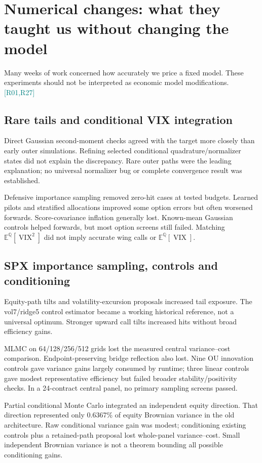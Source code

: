 \documentclass[11pt,a4paper]{article}
\newcommand{\E}{\mathbb E^{\mathbb Q}}
\newcommand{\VIX}{\operatorname{VIX}}
\newcommand{\src}[1]{\textcolor{teal}{\small[#1]}}
\begin{document}
\section{Numerical changes: what they taught us without changing the model}\label{sec:numerics}
Many weeks of work concerned how accurately we price a fixed model. These experiments should not be interpreted as economic model modifications. \src{R01,R27}

\subsection{Rare tails and conditional VIX integration}
Direct Gaussian second-moment checks agreed with the target more closely than early outer simulations. Refining selected conditional quadrature/normalizer states did not explain the discrepancy. Rare outer paths were the leading explanation; no universal normalizer bug or complete convergence result was established.

Defensive importance sampling removed zero-hit cases at tested budgets. Learned pilots and stratified allocations improved some option errors but often worsened forwards. Score-covariance inflation generally lost. Known-mean Gaussian controls helped forwards, but most option screens still failed. Matching $\E[\VIX^2]$ did not imply accurate wing calls or $\E[\VIX]$.

\subsection{SPX importance sampling, controls and conditioning}
Equity-path tilts and volatility-excursion proposals increased tail exposure. The vol7/ridge5 control estimator became a working historical reference, not a universal optimum. Stronger upward call tilts increased hits without broad efficiency gains.

MLMC on 64/128/256/512 grids lost the measured central variance--cost comparison. Endpoint-preserving bridge reflection also lost. Nine OU innovation controls gave variance gains largely consumed by runtime; three linear controls gave modest representative efficiency but failed broader stability/positivity checks. In a 24-contract central panel, no primary sampling screens passed.

Partial conditional Monte Carlo integrated an independent equity direction. That direction represented only 0.6367\% of equity Brownian variance in the old architecture. Raw conditional variance gain was modest; conditioning existing controls plus a retained-path proposal lost whole-panel variance--cost. Small independent Brownian variance is not a theorem bounding all possible conditioning gains.
\end{document}
